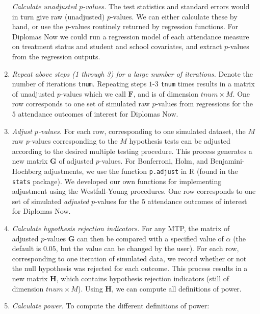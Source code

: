 \documentclass[
]{article}
\begin{document}
\begin{enumerate}
  \emph{Calculate unadjusted \(p\)-values.} The test statistics and
  standard errors would in turn give raw (unadjusted) \(p\)-values. We
  can either calculate these by hand, or use the \(p\)-values routinely
  returned by regression functions. For Diplomas Now we could run a
  regression model of each attendance measure on treatment status and
  student and school covariates, and extract \(p\)-values from the
  regression outputs.
\item
  \emph{Repeat above steps (1 through 3) for a large number of
  iterations.} Denote the number of iterations \texttt{tnum}. Repeating
  steps \(1\)-\(3\) \texttt{tnum} times results in a matrix of
  unadjusted \(p\)-values which we call \(\mathbf{F}\), and is of
  dimension \(tnum \times M\). One row corresponds to one set of
  simulated raw \(p\)-values from regressions for the \(5\) attendance
  outcomes of interest for Diplomas Now.
\item
  \emph{Adjust \(p\)-values.} For each row, corresponding to one
  simulated dataset, the \(M\) raw \(p\)-values corresponding to the
  \(M\) hypothesis tests can be adjusted according to the desired
  multiple testing procedure. This process generates a new matrix
  \(\mathbf{G}\) of adjusted \(p\)-values. For Bonferroni, Holm, and
  Benjamini-Hochberg adjustments, we use the function \texttt{p.adjust}
  in R (found in the \texttt{stats} package). We developed our own
  functions for implementing adjustment using the Westfall-Young
  procedures. One row corresponds to one set of simulated
  \emph{adjusted} \(p\)-values for the \(5\) attendance outcomes of
  interest for Diplomas Now.
\item
  \emph{Calculate hypothesis rejection indicators.} For any MTP, the
  matrix of adjusted \(p\)-values \(\mathbf{G}\) can then be compared
  with a specified value of \(\alpha\) (the default is \(0.05\), but the
  value can be changed by the user). For each row, corresponding to one
  iteration of simulated data, we record whether or not the null
  hypothesis was rejected for each outcome. This process results in a
  new matrix \(\mathbf{H}\), which contains hypothesis rejection
  indicators (still of dimension \(tnum \times M\)). Using
  \(\mathbf{H}\), we can compute all definitions of power.
\item
  \emph{Calculate power.} To compute the different definitions of power:
\end{enumerate}
\end{document}
